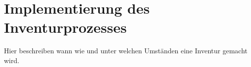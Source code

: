 \chapter{Implementierung des Inventurprozesses}

Hier beschreiben wann wie und unter welchen Umständen eine Inventur gemacht wird. 